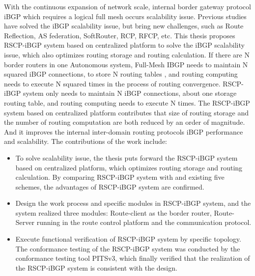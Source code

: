 \begin{eabstract}
   With the continuous expansion of network scale, internal border gateway protocol iBGP which requires a logical full mesh occurs scalability issue. Previous studies have solved the iBGP scalability issue, but bring new challenges, such as Route Reflection, AS federation, SoftRouter, RCP, RFCP, etc. This thesis proposes RSCP-iBGP system based on centralized platform to solve the iBGP scalability issue, which also optimizes routing storage and routing calculation. If there are N border routers in one Autonomous system, Full-Mesh IBGP needs to maintain N squared iBGP connections, to store N routing tables , and routing computing needs to execute N squared times in the process of routing convergence. RSCP-iBGP system only needs to maintain N iBGP connections, about one storage routing table, and routing computing needs to execute N times. The RSCP-iBGP system based on centralized platform contributes that size of routing storage and the number of routing computation are both reduced by an order of magnitude. And it improves the internal inter-domain routing protocols iBGP performance and scalability. The contributions of the work include:

   \begin{itemize}
    \item To solve scalability issue, the thesis puts forward the RSCP-iBGP system based on centralized platform, which optimizes routing storage and routing calculation. By comparing RSCP-iBGP system with and existing five schemes, the advantages of RSCP-iBGP system are confirmed.
    \item Design the work process and specific modules in RSCP-iBGP system, and the system realized three modules: Route-client as the border router, Route-Server running in the route control platform and the communication protocol.
    \item Execute functional verification of RSCP-iBGP system by specific topology. The conformance testing of the RSCP-iBGP system was conducted by the conformance testing tool PITSv3, which finally verified that the realization of the RSCP-iBGP system is consistent with the design.
  \end{itemize}
\end{eabstract}




